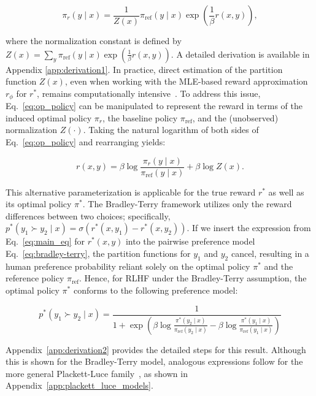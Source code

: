 \begin{equation}\label{eq:op_policy}
    \pi_r(y\mid x) = \frac{1}{Z(x)}\pi_\text{ref}(y\mid x)\exp\left(\frac{1}{\beta}r(x, y)\right),
\end{equation}

where the normalization constant is defined by $Z(x) =\sum_{y}\pi_\text{ref}(y\mid x)\exp\left(\frac{1}{\beta}r(x, y)\right)$. A detailed derivation is available in Appendix \ref{app:derivation1}. In practice, direct estimation of the partition function $Z(x)$, even when working with the MLE-based reward approximation $r_\phi$ for $r^*$, remains computationally intensive~\citep{korbak2022reinforcement, go2023aligning}. To address this issue, Eq.~\ref{eq:op_policy} can be manipulated to represent the reward in terms of the induced optimal policy $\pi_r$, the baseline policy $\pi_\text{ref}$, and the (unobserved) normalization $Z(\cdot)$. Taking the natural logarithm of both sides of Eq.~\ref{eq:op_policy} and rearranging yields:

\begin{equation}\label{eq:main_eq}
    r(x,y) =\beta \log \frac{\pi_r(y\mid x)}{\pi_\text{ref}(y\mid x)} + \beta \log Z(x).
\end{equation}

This alternative parameterization is applicable for the true reward $r^*$ as well as its optimal policy $\pi^*$. The Bradley-Terry framework utilizes only the reward differences between two choices; specifically, $p^*(y_1 \succ y_2 \mid x) = \sigma(r^*(x, y_1) - r^*(x, y_2))$. If we insert the expression from Eq.~\ref{eq:main_eq} for $r^*(x,y)$ into the pairwise preference model Eq.~\ref{eq:bradley-terry}, the partition functions for $y_1$ and $y_2$ cancel, resulting in a human preference probability reliant solely on the optimal policy $\pi^*$ and the reference policy $\pi_\text{ref}$. Hence, for RLHF under the Bradley-Terry assumption, the optimal policy $\pi^*$ conforms to the following preference model:

\begin{equation}\label{eq:objective}
    p^*(y_1\succ y_2 \mid x)=\frac{1}{1 + \exp\left(\beta \log \frac{\pi^*(y_2\mid x)}{\pi_\text{ref}(y_2\mid x)} - \beta \log \frac{\pi^*(y_1\mid x)}{\pi_\text{ref}(y_1\mid x)}\right)}
\end{equation}

Appendix~\ref{app:derivation2} provides the detailed steps for this result. Although this is shown for the Bradley-Terry model, analogous expressions follow for the more general Plackett-Luce family~\citep{plackett1975analysis, luce2012individual}, as shown in Appendix~\ref{app:plackett_luce_models}.

